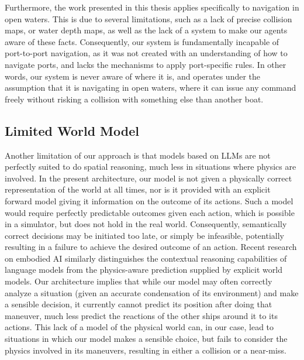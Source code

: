 \documentclass[10pt]{reportMaster}
\begin{document}
Furthermore, the work presented in this thesis applies specifically to navigation in open waters. This is due to several limitations, such as a lack of precise collision maps, or water depth maps, as well as the lack of a system to make our agents aware of these facts. Consequently, our system is fundamentally incapable of port-to-port navigation, as it was not created with an understanding of how to navigate ports, and lacks the mechanisms to apply port-specific rules. In other words, our system is never aware of where it is, and operates under the assumption that it is navigating in open waters, where it can issue any command freely without risking a collision with something else than another boat. 

\subsection{Limited World Model}

Another limitation of our approach is that models based on LLMs are not perfectly suited to do spatial reasoning, much less in situations where physics are involved. In the present architecture, our model is not given a physically correct representation of the world at all times, nor is it provided with an explicit forward model giving it information on the outcome of its actions. Such a model would require perfectly predictable outcomes given each action, which is possible in a simulator, but does not hold in the real world. Consequently, semantically correct decisions may be initiated too late, or simply be infeasible, potentially resulting in a failure to achieve the desired outcome of an action. Recent research on embodied AI similarly distinguishes the contextual reasoning capabilities of language models from the physics-aware prediction supplied by explicit world models\cite{feng2025embodiedaillmsworld}. Our architecture implies that while our model may often correctly analyze a situation (given an accurate condensation of its environment) and make a sensible decision, it currently cannot predict its position after doing that maneuver, much less predict the reactions of the other ships around it to its actions. This lack of a model of the physical world can, in our case, lead to situations in which our model makes a sensible choice, but fails to consider the physics involved in its maneuvers, resulting in either a collision or a near-miss.
\end{document}
